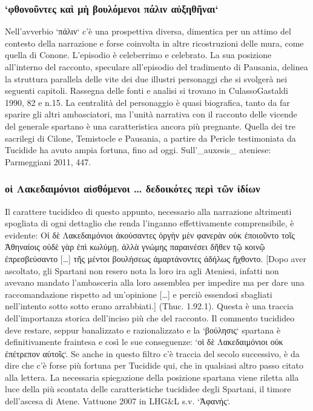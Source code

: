             \subsubsection{`φθονοῦντες καὶ μὴ βουλόμενοι πάλιν αὐξηθῆναι`}
           Nell'avverbio `πάλιν` c'è una prospettiva diversa, dimentica per un attimo del contesto della narrazione e forse coinvolta in altre ricostruzioni delle mura, come quella di Conone.  L'episodio è celeberrimo e celebrato. La sua posizione all'interno del racconto, speculare all'episodio del tradimento di Pausania, delinea la struttura parallela delle vite dei due illustri personaggi che si svolgerà nei seguenti capitoli. Rassegna delle fonti e analisi si trovano in CulassoGastaldi 1990, 82 e n.15. La centralità del personaggio è quasi biografica, tanto da far sparire gli altri ambasciatori, ma l'unità narrativa con il racconto delle vicende del generale spartano è una caratteristica ancora più pregnante. Quella dei tre sacrilegi di Cilone, Temistocle e Pausania, a partire da Pericle  testimoniata da Tucidide ha avuto ampia fortuna, fino ad oggi. Sull'_auxesis_ ateniese: Parmeggiani 2011, 447.
            \subsubsection{\textgreek{οἱ Λακεδαιμόνιοι αἰσθόμενοι … δεδοικότες περὶ τῶν ἰδίων}}
            Il carattere tucidideo di questo appunto, necessario alla narrazione altrimenti spogliata di ogni dettaglio che renda l'inganno effettivamente comprensibile, è evidente: \textgreek{Οἱ δὲ Λακεδαιμόνιοι ἀκούσαντες ὀργὴν μὲν φανερὰν οὐκ ἐποιοῦντο τοῖς Ἀθηναίοις οὐδὲ γὰρ ἐπὶ κωλύμῃ, ἀλλὰ γνώμης παραινέσει δῆθεν τῷ κοινῷ ἐπρεσβεύσαντο […] τῆς μέντοι βουλήσεως ἁμαρτάνοντες ἀδήλως ἤχθοντο.} [Dopo aver ascoltato, gli Spartani non resero nota la loro ira agli Ateniesi, infatti non avevano mandato l'ambasceria alla loro assemblea per impedire ma per dare una raccomandazione rispetto ad un'opinione […] e perciò essendosi sbagliati nell'intento sotto sotto erano arrabbiati.] (Thuc. 1.92.1). Questa è una traccia dell'importanza storica dell'inciso più che del racconto. Il commento tucidideo deve restare, seppur banalizzato e razionalizzato e la `βούλησις` spartana è definitivamente fraintesa e così le sue conseguenze: `οἱ δὲ Λακεδαιμόνιοι οὐκ ἐπέτρεπον αὐτοῖς`. Se anche in questo filtro c'è traccia del secolo successivo,  è da dire che c'è forse più fortuna per Tucidide qui, che in qualsiasi altro passo citato alla lettera. La necessaria spiegazione della posizione spartana viene riletta alla luce della più scontata delle caratteristiche tucididee degli Spartani, il timore dell'ascesa di Atene. Vattuone 2007 in LHG\&L s.v. `Ἀφανής`.
